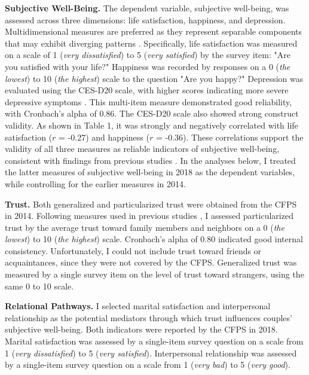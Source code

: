 \textbf{Subjective Well-Being.} The dependent variable, subjective well-being, was assessed across three dimensions: life satisfaction, happiness, and depression. Multidimensional measures are preferred as they represent separable components that may exhibit diverging patterns \parencite{pavotAssessmentSubjectiveWellBeing2008}. Specifically, life satisfaction was measured on a scale of 1 (\textit{very dissatisfied}) to 5 (\textit{very satisfied}) by the survey item: "Are you satisfied with your life?" Happiness was recorded by responses on a 0 (\textit{the lowest}) to 10 (\textit{the highest}) scale to the question "Are you happy?" Depression was evaluated using the CES-D20 scale, with higher scores indicating more severe depressive symptoms \parencite{radloffCESDScaleSelfReport1977}. This multi-item measure demonstrated good reliability, with Cronbach's alpha of 0.86. The CES-D20 scale also showed strong construct validity. As shown in Table 1, it was strongly and negatively correlated with life satisfaction ($r$ = -0.27) and happiness ($r$ = -0.36).  These correlations support the validity of all three measures as reliable indicators of subjective well-being, consistent with findings from previous studies \parencite{dienerSubjectiveWellBeingScience2009}. In the analyses below, I treated the latter measures of subjective well-being in 2018 as the dependent variables, while controlling for the earlier measures in 2014.

\textbf{Trust.} Both generalized and particularized trust were obtained from the CFPS in 2014. Following measures used in previous studies \parencite{churchillTrustSocialNetworks2017,baiSocialTrustPattern2019,kramerIngroupOutgroupTrust2017}, I assessed particularized trust by the average trust toward family members and neighbors on a 0 (\textit{the lowest}) to 10 (\textit{the highest}) scale. Cronbach's alpha of 0.80 indicated good internal consistency. Unfortunately, I could not include trust toward friends or acquaintances, since they were not covered by the CFPS. Generalized trust was measured by a single survey item on the level of trust toward strangers, using the same 0 to 10 scale.

\textbf{Relational Pathways.} I selected marital satisfaction and interpersonal relationship as the potential mediators through which trust influences couples' subjective well-being. Both indicators were reported by the CFPS in 2018. Marital satisfaction was assessed by a single-item survey question on a scale from 1 (\textit{very dissatisfied}) to 5 (\textit{very satisfied}). Interpersonal relationship was assessed by a single-item survey question on a scale from 1 (\textit{very bad}) to 5 (\textit{very good}).


